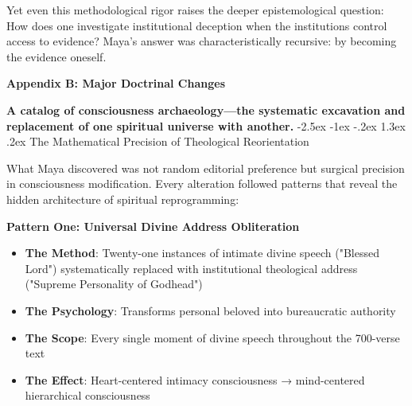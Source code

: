 \documentclass[12pt,twoside]{book}
\makeatletter
\renewcommand\section{\@startsection{section}{1}{\z@}%
{-2.5ex \@plus -1ex \@minus -.2ex}%
{1.3ex \@plus.2ex}%
{\normalfont\Large\bfseries}}
\makeatother
\begin{document}
Yet even this methodological rigor raises the deeper epistemological question: How does one investigate institutional deception when the institutions control access to evidence? Maya's answer was characteristically recursive: by becoming the evidence oneself.

\clearpage
\thispagestyle{empty}
\mbox{}
\newpage
\pagestyle{sectionopening}
\thispagestyle{sectionopening}
\markboth{}{}
\markright{}
\vspace*{0.25\textheight}
\begin{center}
{\Huge\bfseries Appendix B: Major Doctrinal Changes}
\end{center}
\newpage

\textbf{A catalog of consciousness archaeology—the systematic excavation and replacement of one spiritual universe with another.}
\section{The Mathematical Precision of Theological Reorientation}
\label{sec:org928debc}

What Maya discovered was not random editorial preference but surgical precision in consciousness modification. Every alteration followed patterns that reveal the hidden architecture of spiritual reprogramming:

\textbf{\textbf{Pattern One: Universal Divine Address Obliteration}}
\begin{itemize}
\item \textbf{\textbf{The Method}}: Twenty-one instances of intimate divine speech ("Blessed Lord") systematically replaced with institutional theological address ("Supreme Personality of Godhead")
\item \textbf{\textbf{The Psychology}}: Transforms personal beloved into bureaucratic authority
\item \textbf{\textbf{The Scope}}: Every single moment of divine speech throughout the 700-verse text
\item \textbf{\textbf{The Effect}}: Heart-centered intimacy consciousness → mind-centered hierarchical consciousness
\end{itemize}
\end{document}
